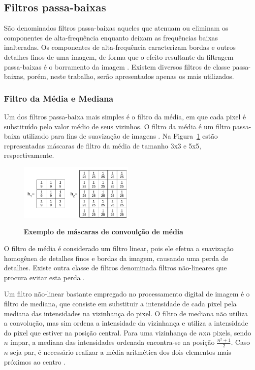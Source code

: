 \documentclass[12pt,oneside,a4paper,english,french,spanish,brazil,]{abntex2}
\begin{document}
\subsection{Filtros passa-baixas}

São denominados filtros passa-baixas aqueles que atenuam ou eliminam os componentes de alta-frequência enquanto deixam as frequências baixas inalteradas. Os componentes de alta-frequência caracterizam bordas e outros detalhes finos de uma imagem, de forma que o efeito resultante da filtragem passa-baixas é o borramento da imagem \cite{gonzalez:2012}. Existem diversos filtros de classe passa-baixas, porém, neste trabalho, serão apresentados apenas os mais utilizados.

\subsubsection{Filtro da Média e Mediana}

Um dos filtros passa-baixa mais simples é o filtro da média, em que cada pixel é substituído pelo valor médio de seus vizinhos. O filtro da média é um filtro passa-baixa utilizado para fins de suavização de imagens \cite{pedrini:2008}. Na Figura~\ref{fig:PDI_Mascara_Media} estão representadas máscaras de filtro da média de tamanho 3x3 e 5x5, respectivamente.

\begin{figure}[ht]
\centering
\caption{\textbf{Exemplo de máscaras de convoulção de média}}
\includegraphics[width=0.5\textwidth]{imagens/PDI_Mascara_Media.pdf}
\label{fig:PDI_Mascara_Media}
\end{figure}

O filtro de média é considerado um filtro linear, pois ele efetua a suavização homogênea de detalhes finos e bordas da imagem, causando uma perda de detalhes. Existe outra classe de filtros denominada filtros não-lineares que procura evitar esta perda \cite{pedrini:2008}.

Um filtro não-linear bastante empregado no processamento digital de imagem é o filtro de mediana, que consiste em substituir a intensidade de cada pixel pela mediana das intensidades na vizinhança do pixel. O filtro de mediana não utiliza a convolução, mas sim ordena a intensidade da vizinhança e utiliza a intensidade do pixel que estiver na posição central. Para uma vizinhança de \(n\)x\(n\) pixels, sendo \(n\) ímpar, a mediana das intensidades ordenada encontra-se na posição \(\frac{n^2+1}{2}\). Caso \(n\) seja par, é necessário realizar a média aritmética dos dois elementos mais próximos ao centro \cite{gonzalez:2012}. 
\end{document}
